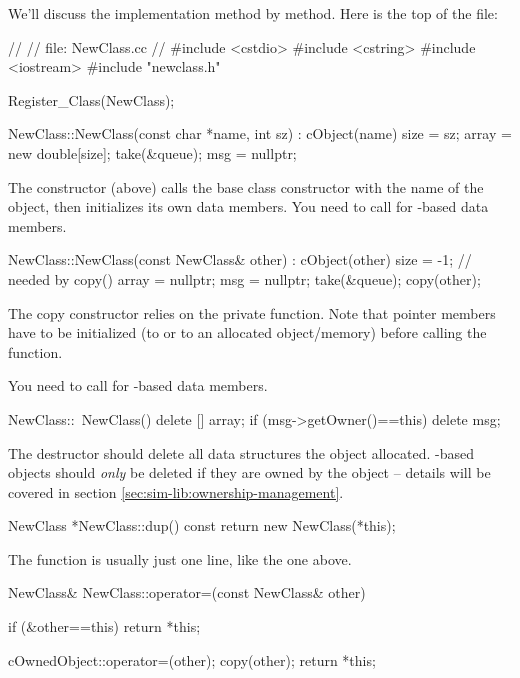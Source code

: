 We'll discuss the implementation method by method.
Here is the top of the  file:

\begin{cpp}
//
// file: NewClass.cc
//
#include <cstdio>
#include <cstring>
#include <iostream>
#include "newclass.h"

Register_Class(NewClass);

NewClass::NewClass(const char *name, int sz) : cObject(name)
{
    size = sz;
    array = new double[size];
    take(&queue);
    msg = nullptr;
}
\end{cpp}

The constructor (above) calls the base class constructor with
the name of the object, then initializes its own data members.
You need to call  for -based data members.

\begin{cpp}
NewClass::NewClass(const NewClass& other) : cObject(other)
{
    size = -1; // needed by copy()
    array = nullptr;
    msg = nullptr;
    take(&queue);
    copy(other);
}
\end{cpp}

The copy constructor relies on the private  function.
Note that pointer members have to be initialized (to  or to an
allocated object/memory) before calling the  function.

You need to call  for -based data members.

\begin{cpp}
NewClass::~NewClass()
{
    delete [] array;
    if (msg->getOwner()==this)
        delete msg;
}
\end{cpp}

The destructor should delete all data structures the object allocated.
-based objects should \textit{only} be deleted if they
are owned by the object -- details will be covered in section
\ref{sec:sim-lib:ownership-management}.

\begin{cpp}
NewClass *NewClass::dup() const
{
    return new NewClass(*this);
}
\end{cpp}

The  function  is usually just one line, like the one above.

\begin{cpp}
NewClass& NewClass::operator=(const NewClass& other)
{
    if (&other==this)
        return *this;

    cOwnedObject::operator=(other);
    copy(other);
    return *this;
}
\end{cpp}

